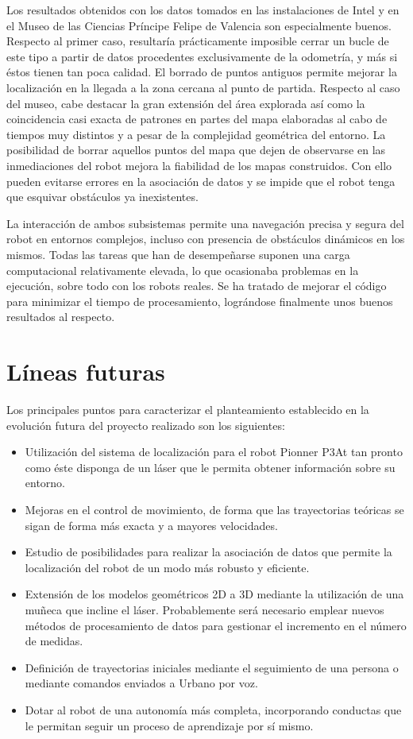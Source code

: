\begin{itemize}
  Los resultados obtenidos con los datos tomados en las instalaciones de Intel y en el Museo de las Ciencias Príncipe Felipe de Valencia son especialmente buenos. Respecto al primer caso, resultaría prácticamente imposible cerrar un bucle de este tipo a partir de datos procedentes exclusivamente de la odometría, y más si éstos tienen tan poca calidad. El borrado de puntos antiguos permite mejorar la localización en la llegada a la zona cercana al punto de partida. Respecto al caso del museo, cabe destacar la gran extensión del área explorada así como la coincidencia casi exacta de patrones en partes del mapa elaboradas al cabo de tiempos muy distintos y a pesar de la complejidad geométrica del entorno. La posibilidad de borrar aquellos puntos del mapa que dejen de observarse en las inmediaciones del robot mejora la fiabilidad de los mapas construidos. Con ello pueden evitarse errores en la asociación de datos y se impide que el robot tenga que esquivar obstáculos ya inexistentes.

\end{itemize}

La interacción de ambos subsistemas permite una navegación precisa y segura del robot en entornos complejos, incluso con presencia de obstáculos dinámicos en los mismos. Todas las tareas que han de desempeñarse suponen una carga computacional relativamente elevada, lo que ocasionaba problemas en la ejecución, sobre todo con los robots reales. Se ha tratado de mejorar el código para minimizar el tiempo de procesamiento, lográndose finalmente unos buenos resultados al respecto.

\section{Líneas futuras}
Los principales puntos para caracterizar el planteamiento establecido en la evolución futura del proyecto realizado son los siguientes:

\begin{itemize}
  \item Utilización del sistema de localización para el robot Pionner P3At tan pronto como éste disponga de un láser que le permita obtener información sobre su entorno.
  \item Mejoras en el control de movimiento, de forma que las trayectorias teóricas se sigan de forma más exacta y a mayores velocidades.
  \item Estudio de posibilidades para realizar la asociación de datos que permite la localización del robot de un modo más robusto y eficiente.
  \item Extensión de los modelos geométricos 2D a 3D mediante la utilización de una muñeca que incline el láser. Probablemente será necesario emplear nuevos métodos de procesamiento de datos para gestionar el incremento en
      el número de medidas.
  \item Definición de trayectorias iniciales mediante el seguimiento de una persona o mediante comandos enviados a Urbano por voz.
  \item Dotar al robot de una autonomía más completa, incorporando conductas que le permitan seguir un proceso de aprendizaje por sí mismo.
\end{itemize}

